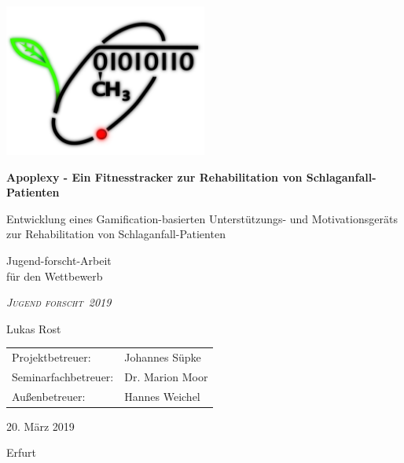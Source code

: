 \documentclass[a4paper, 11pt, titlepage, bibliography=totocnumbered]{scrartcl}
\begin{document}
\begin{titlepage}
	\centering
	\includegraphics[width=0.5\textwidth]{pics/logo}\par\vspace{1cm}
	{\huge\bfseries Apoplexy - Ein Fitnesstracker zur Rehabilitation von Schlaganfall-Patienten \par}
	\vspace{0.3cm}
	{\large Entwicklung eines Gamification-basierten Unterstützungs- und Motivationsgeräts zur Rehabilitation von Schlaganfall-Patienten \par}
	\vspace{2cm}
	{\Large Jugend-forscht-Arbeit\\ \large für den Wettbewerb \\}
		{\scshape\Large\itshape \glqq Jugend forscht\grqq ~2019 \par}
	\vspace{2cm}
	{\Large Lukas Rost}
	\vfill
	{\begin{tabular}{ll}
	\Large Projektbetreuer: & \Large Johannes Süpke \\[5pt]
	\Large Seminarfachbetreuer: & \Large Dr. Marion Moor \\[5pt]
	\Large Außenbetreuer: & \Large Hannes Weichel \\
	\end{tabular}}
	\vfill
	{\Large 20. März 2019\par Erfurt}
\end{titlepage}

\newpage

\renewcommand{\abstractname}{Kurzfassung}

\begin{abstract}\hspace*{-1em}Oft erleiden Schlaganfall-Patienten eine Armlähmung, welche im Folgenden therapiert werden muss, um wieder Bewegungsfähigkeit herzustellen. In dieser Arbeit sollen die Methoden der Gamification (Spielifizierung) angewandt werden, um ein Gerät zur Unterstützung und Motivation der Patienten während der Therapie zu entwickeln. Dabei werden spieltypische Elemente wie Erfahrungspunkte und Aufgaben in die Rehabilitation eingebracht. \\ \\ Das Gerät besteht aus einem die Muskelaktivität messenden Sensor und einem Mikrocontroller, der seine Messdaten an ein Smartphone mit einer Begleitapp weiterleitet. Diese Begleitapp soll nach dem Modell konventioneller Fitness-Apps spielerisch zur Nutzung des Geräts anregen sowie ein Minispiel bieten. \\ \\
\end{abstract}
\end{document}
